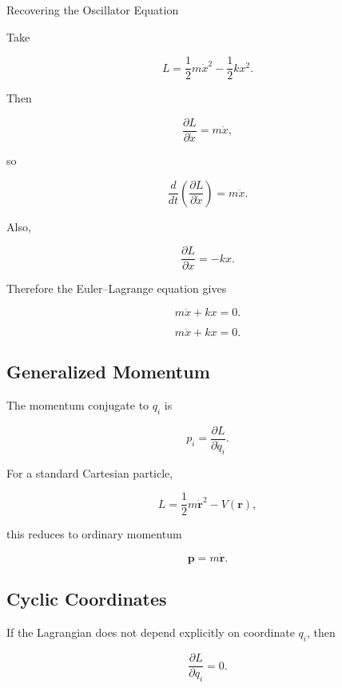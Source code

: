 \begin{workedexamplebox}{Recovering the Oscillator Equation}

Take

\[
L
=
\frac12m\dot{x}^2
-
\frac12kx^2.
\]

Then

\[
\frac{\partial L}{\partial\dot{x}}
=
m\dot{x},
\]

so

\[
\frac{d}{dt}
\left(
\frac{\partial L}{\partial\dot{x}}
\right)
=
m\ddot{x}.
\]

Also,

\[
\frac{\partial L}{\partial x}
=
-kx.
\]

Therefore the Euler--Lagrange equation gives

\[
m\ddot{x}+kx=0.
\]

\begin{answerbox}
\[
\boxed{
m\ddot{x}+kx=0.
}
\]
\end{answerbox}

\end{workedexamplebox}

\subsection{Generalized Momentum}
\label{subsec:generalized-momentum}

The momentum conjugate to \(q_i\) is

\[
\boxed{
p_i
=
\frac{\partial L}{\partial\dot q_i}.
}
\]

For a standard Cartesian particle,

\[
L
=
\frac12m\dot{\mathbf{r}}^2
-
V(\mathbf{r}),
\]

this reduces to ordinary momentum

\[
\boxed{
\mathbf{p}
=
m\dot{\mathbf{r}}.
}
\]

\subsection{Cyclic Coordinates}
\label{subsec:cyclic-coordinates}

If the Lagrangian does not depend explicitly on coordinate \(q_i\), then

\[
\frac{\partial L}{\partial q_i}=0.
\]

